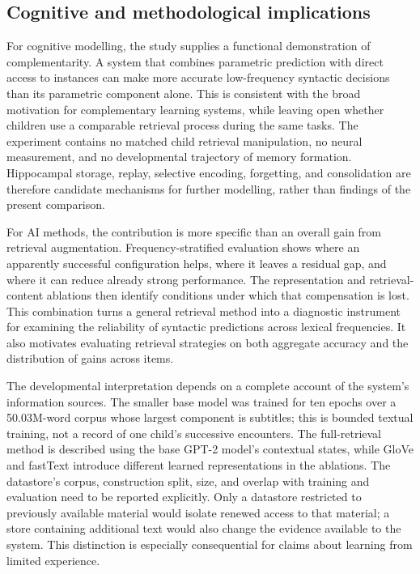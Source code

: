 \subsection{Cognitive and methodological implications}

For cognitive modelling, the study supplies a functional demonstration of complementarity. A system that combines parametric prediction with direct access to instances can make more accurate low-frequency syntactic decisions than its parametric component alone. This is consistent with the broad motivation for complementary learning systems, while leaving open whether children use a comparable retrieval process during the same tasks. The experiment contains no matched child retrieval manipulation, no neural measurement, and no developmental trajectory of memory formation. Hippocampal storage, replay, selective encoding, forgetting, and consolidation are therefore candidate mechanisms for further modelling, rather than findings of the present comparison.

For AI methods, the contribution is more specific than an overall gain from retrieval augmentation. Frequency-stratified evaluation shows where an apparently successful configuration helps, where it leaves a residual gap, and where it can reduce already strong performance. The representation and retrieval-content ablations then identify conditions under which that compensation is lost. This combination turns a general retrieval method into a diagnostic instrument for examining the reliability of syntactic predictions across lexical frequencies. It also motivates evaluating retrieval strategies on both aggregate accuracy and the distribution of gains across items.

The developmental interpretation depends on a complete account of the system's information sources. The smaller base model was trained for ten epochs over a 50.03M-word corpus whose largest component is subtitles; this is bounded textual training, not a record of one child's successive encounters. The full-retrieval method is described using the base GPT-2 model's contextual states, while GloVe and fastText introduce different learned representations in the ablations. The datastore's corpus, construction split, size, and overlap with training and evaluation need to be reported explicitly. Only a datastore restricted to previously available material would isolate renewed access to that material; a store containing additional text would also change the evidence available to the system. This distinction is especially consequential for claims about learning from limited experience.

